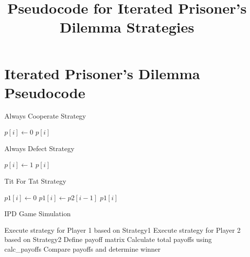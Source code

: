 \documentclass{article}
\begin{document}
\title{Pseudocode for Iterated Prisoner's Dilemma Strategies}
\author{}
\date{}
\maketitle

\section*{Iterated Prisoner's Dilemma Pseudocode}

\begin{algorithm}
\caption{Always Cooperate Strategy}
\begin{algorithmic}[1]
\State $p[i] \gets 0$ 
\State \Return $p[i]$
\EndProcedure
\end{algorithmic}
\end{algorithm}

\begin{algorithm}
\caption{Always Defect Strategy}
\begin{algorithmic}[1]
\State $p[i] \gets 1$ 
\State \Return $p[i]$
\EndProcedure
\end{algorithmic}
\end{algorithm}

\begin{algorithm}
\caption{Tit For Tat Strategy}
\begin{algorithmic}[1]
    \State $p1[i] \gets 0$ 
\Else
    \State $p1[i] \gets p2[i-1]$ 
\EndIf
\State \Return $p1[i]$
\EndProcedure
\end{algorithmic}
\end{algorithm}

\begin{algorithm}
\caption{IPD Game Simulation}
\begin{algorithmic}[1]
 
    \State Execute strategy for Player 1 based on Strategy1
    \State Execute strategy for Player 2 based on Strategy2
\EndFor
\State Define payoff matrix
\State Calculate total payoffs using calc\_payoffs
\State Compare payoffs and determine winner
\EndProcedure
\end{algorithmic}
\end{algorithm}
\end{document}
